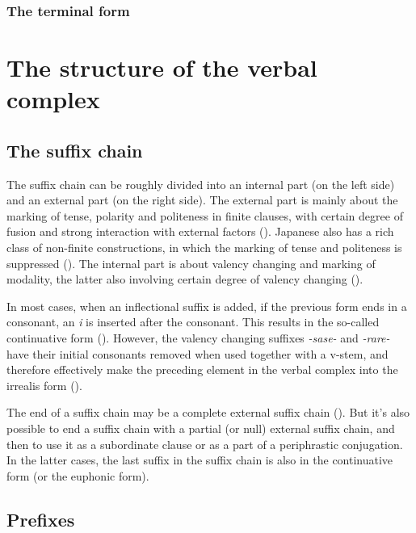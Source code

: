 \documentclass[UTF8, a4paper, oneside, scheme=plain]{ctexrep}
\newcommand{\corpus}[1]{\emph{#1}}
\begin{document}
\subsubsection{The terminal form}\label{sec:adjective-terminal-form}

\section{The structure of the verbal complex}\label{sec:verbal-complex-overview}

\subsection{The suffix chain}\label{sec:suffix-chain}

The suffix chain can be roughly divided into an internal part (on the left side) 
and an external part (on the right side). 
The external part is mainly about 
the marking of tense, polarity and politeness in finite clauses,
with certain degree of fusion
and strong interaction with external factors ().
Japanese also has a rich class of non-finite constructions,
in which the marking of tense and politeness is suppressed ().
The internal part is about valency changing and marking of modality,
the latter also involving certain degree of valency changing ().

In most cases,
when an inflectional suffix is added,
if the previous form ends in a consonant,
an \corpus{i} is inserted after the consonant.
This results in the so-called continuative form ().
However, the valency changing suffixes \corpus{-sase-} and \corpus{-rare-}
have their initial consonants removed when used together with a v-stem,
and therefore effectively make the preceding element in the verbal complex into the irrealis form 
().

The end of a suffix chain may be a complete external suffix chain 
().
But it's also possible to end a suffix chain with a partial (or null) external suffix chain,
and then to use it as a subordinate clause or as a part of a periphrastic conjugation.
In the latter cases, 
the last suffix in the suffix chain is also in the continuative form
(or the euphonic form).

\subsection{Prefixes}\label{sec:prefixes}
\end{document}
